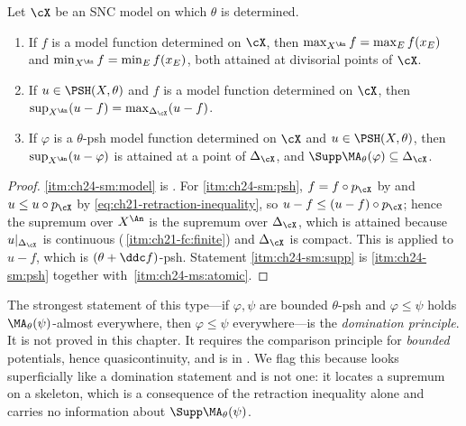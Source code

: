 \begin{proposition}
\label{prop:ch24-skeletal-maximum}
Let $\cX$ be an SNC model on which $\theta$ is determined.
\begin{enumerate}
\item\label{itm:ch24-sm:model} If $f$ is a model function determined on
 $\cX$, then $\max_{X^{\An}}f=\max_{E}f(x_E)$ and
 $\min_{X^{\An}}f=\min_Ef(x_E)$, both attained at divisorial points of
 $\cX$.
\item\label{itm:ch24-sm:psh} If $u\in\PSH(X,\theta)$ and $f$ is a model
 function determined on $\cX$, then
 $\sup_{X^{\An}}(u-f)=\max_{\Delta_{\cX}}(u-f)$.
\item\label{itm:ch24-sm:supp} If $\varphi$ is a $\theta$-psh model
 function determined on $\cX$ and $u\in\PSH(X,\theta)$, then
 $\sup_{X^{\An}}(u-\varphi)$ is attained at a point of $\Delta_{\cX}$,
 and $\Supp\MA_\theta(\varphi)\subseteq\Delta_{\cX}$.
\end{enumerate}
\end{proposition}

\begin{proof}
\cref{itm:ch24-sm:model} is .  For
\cref{itm:ch24-sm:psh}, $f=f\circ p_{\cX}$ by
 and $u\leq u\circ p_{\cX}$ by
\eqref{eq:ch21-retraction-inequality}, so
$u-f\leq(u-f)\circ p_{\cX}$; hence the supremum over $X^{\An}$ is the
supremum over $\Delta_{\cX}$, which is attained because
$u|_{\Delta_{\cX}}$ is continuous
(\,\cref{itm:ch21-fc:finite}) and
$\Delta_{\cX}$ is compact.  This is
 applied to $u-f$, which is
$(\theta+\ddc f)$-psh.  Statement \cref{itm:ch24-sm:supp} is
\cref{itm:ch24-sm:psh} together with
\,\cref{itm:ch24-ms:atomic}.
\end{proof}

\begin{remark}
\label{rem:ch24-domination-scope}
The strongest statement of this type---if $\varphi,\psi$ are bounded
$\theta$-psh and $\varphi\leq\psi$ holds
$\MA_\theta(\psi)$-almost everywhere, then $\varphi\leq\psi$
everywhere---is the \emph{domination principle}.  It is not proved in this
chapter.  It requires the comparison principle for \emph{bounded}
potentials, hence quasicontinuity, and is
 in .  We
flag this because  looks superficially like
a domination statement and is not one: it locates a supremum on a skeleton,
which is a consequence of the retraction inequality alone and carries no
information about $\Supp\MA_\theta(\psi)$.
\end{remark}

